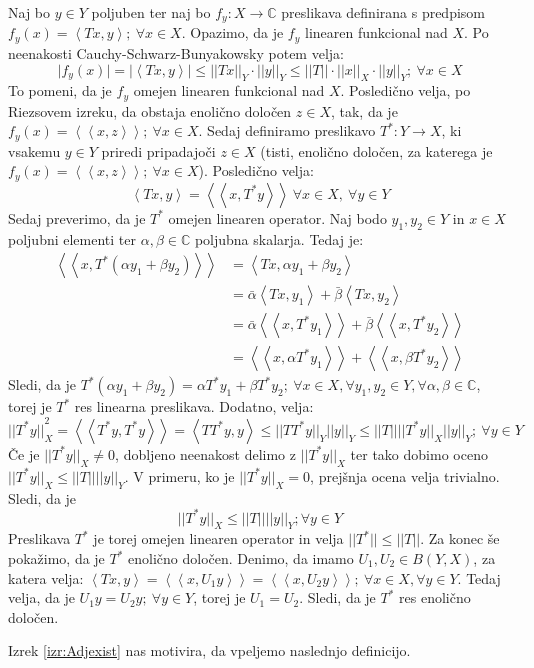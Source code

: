 \documentclass[mat2]{matdelo}
\newcommand{\C}{\mathbb{C}}
\newcommand{\abs}[1]{\ensuremath{\lvert #1 \rvert}}
\newcommand{\norm}[1]{\abs{\abs{#1}}}
\newcommand{\Sp}[2]{\ensuremath{\left<#1, #2\right>}}
\newcommand{\Spp}[2]{\ensuremath{\left<\left<#1, #2\right>\right>}}
\newcommand{\map}[3]{\ensuremath{{#1}:{#2}\rightarrow{#3}}}
\begin{document}
			\begin{dokaz}
				Naj bo $y\in Y$ poljuben ter naj bo $\map{f_y}{X}{\C}$ preslikava definirana s predpisom $f_y(x) = \Sp{Tx}{y};~\forall x\in X$. Opazimo, da je $f_y$ linearen funkcional nad $X$. Po neenakosti Cauchy-Schwarz-Bunyakowsky potem velja: $$\abs{f_y(x)} = \abs{\Sp{Tx}{y}} \leq \norm{Tx}_Y \cdot \norm{y}_Y \leq \norm{T}\cdot\norm{x}_X\cdot\norm{y}_Y;~ \forall x\in X$$ To pomeni, da je $f_y$ omejen linearen funkcional nad $X$. Posledično velja, po Riezsovem izreku, da obstaja enolično določen $z\in X$, tak, da je $f_y(x) = \Spp{x}{z};~\forall x\in X$. Sedaj definiramo preslikavo $\map{T^*}{Y}{X}$, ki vsakemu $y\in Y$ priredi pripadajoči $z\in X$ (tisti, enolično določen, za katerega je $f_y(x) = \Spp{x}{z};~\forall x\in X$). Posledično velja: $$\Sp{Tx}{y}=\Spp{x}{T^*y}~\forall x\in X,~\forall y\in Y$$
				Sedaj preverimo, da je $T^*$ omejen linearen operator. Naj bodo $y_1, y_2 \in Y$ in $x\in X$ poljubni elementi ter $\alpha, \beta \in \C$ poljubna skalarja. Tedaj je: \begin{align*}
					\Spp{x}{T^*(\alpha y_1 + \beta y_2)} &= \Sp{Tx}{\alpha y_1 + \beta y_2} \\
					&= \bar{\alpha}\Sp{Tx}{y_1} + \bar{\beta}\Sp{Tx}{y_2} \\
					&= \bar{\alpha}\Spp{x}{T^*y_1} + \bar{\beta}\Spp{x}{T^*y_2} \\
					&= \Spp{x}{\alpha T^*y_1} + \Spp{x}{\beta T^*y_2}
				\end{align*}
				Sledi, da je $T^*(\alpha y_1 + \beta y_2)=\alpha T^*y_1 + \beta T^*y_2;~\forall x\in X, \forall y_1, y_2 \in Y, \forall \alpha, \beta \in \C$, torej je $T^*$ res linearna preslikava. Dodatno, velja: $$\norm{T^*y}_X^2 = \Spp{T^*y}{T^*y} = \Sp{TT^*y}{y} \leq \norm{TT^*y}_Y\norm{y}_Y \leq \norm{T}\norm{T^*y}_X\norm{y}_Y;~\forall y\in Y$$
				Če je $\norm{T^*y}_X \neq 0$, dobljeno neenakost delimo z $\norm{T^*y}_X$ ter tako dobimo oceno $\norm{T^*y}_X \leq \norm{T}\norm{y}_Y$. V primeru, ko je $\norm{T^*y}_X = 0$, prejšnja ocena velja trivialno. Sledi, da je $$\norm{T^*y}_X \leq \norm{T}\norm{y}_Y; \forall y\in Y$$
				Preslikava $T^*$ je torej omejen linearen operator in velja $\norm{T^*}\leq \norm{T}$. Za konec še pokažimo, da je $T^*$ enolično določen. Denimo, da imamo $U_1, U_2 \in B(Y, X)$, za katera velja: $\Sp{Tx}{y} = \Spp{x}{U_1 y} = \Spp{x}{U_2 y};~\forall x\in X, \forall y\in Y$. Tedaj velja, da je $U_1y = U_2y;~\forall y\in Y$, torej je $U_1 = U_2$. Sledi, da je $T^*$ res enolično določen.
			\end{dokaz}
			Izrek \ref{izr:Adjexist} nas motivira, da vpeljemo naslednjo definicijo.
		
\end{document}
